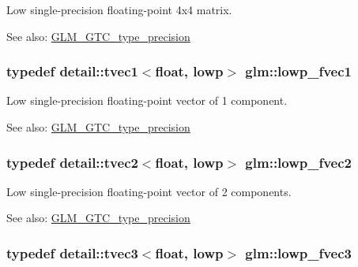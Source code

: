 Low single-precision floating-point 4x4 matrix. \begin{Desc}
\item[See also:]\hyperlink{group__gtc__type__precision}{GLM\_\-GTC\_\-type\_\-precision} \end{Desc}
\hypertarget{group__gtc__type__precision_gd5266f0507395cf8cdfe84b9cf5496e4}{
\subsubsection[lowp\_\-fvec1]{\setlength{\rightskip}{0pt plus 5cm}typedef detail::tvec1$<$float, lowp$>$ {\bf glm::lowp\_\-fvec1}}}
\label{group__gtc__type__precision_gd5266f0507395cf8cdfe84b9cf5496e4}


Low single-precision floating-point vector of 1 component. \begin{Desc}
\item[See also:]\hyperlink{group__gtc__type__precision}{GLM\_\-GTC\_\-type\_\-precision} \end{Desc}
\hypertarget{group__gtc__type__precision_gf365442c52322b810bc0ed943e539229}{
\subsubsection[lowp\_\-fvec2]{\setlength{\rightskip}{0pt plus 5cm}typedef detail::tvec2$<$float, lowp$>$ {\bf glm::lowp\_\-fvec2}}}
\label{group__gtc__type__precision_gf365442c52322b810bc0ed943e539229}


Low single-precision floating-point vector of 2 components. \begin{Desc}
\item[See also:]\hyperlink{group__gtc__type__precision}{GLM\_\-GTC\_\-type\_\-precision} \end{Desc}
\hypertarget{group__gtc__type__precision_g83d77dfe136d4add9e214cd205320c12}{
\subsubsection[lowp\_\-fvec3]{\setlength{\rightskip}{0pt plus 5cm}typedef detail::tvec3$<$float, lowp$>$ {\bf glm::lowp\_\-fvec3}}}
\label{group__gtc__type__precision_g83d77dfe136d4add9e214cd205320c12}


